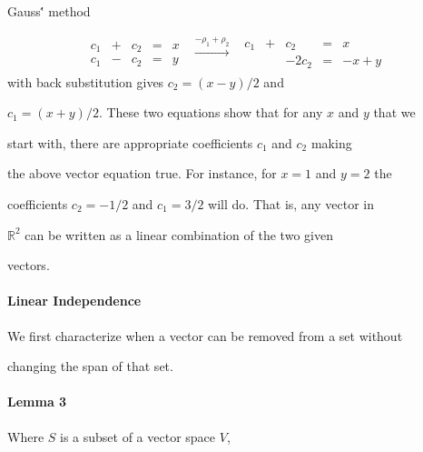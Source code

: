 Gauss\'' method



$$\begin{array}{rcl}

\begin{array}{*{2}{rc}r}

c_1  &+  &c_2  &=  &x  \\c_1  &-  &c_2  &=  &y

\end{array}

&\xrightarrow[]{-\rho_1+\rho_2}

&\begin{array}{*{2}{rc}r}

c_1  &+  &c_2    &=  &x  \\&   &-2c_2  &=  &-x+y

\end{array}

\end{array}$$ with back substitution gives $c_2=(x-y)/2$ and

$c_1=(x+y)/2$. These two equations show that for any $x$ and $y$ that we

start with, there are appropriate coefficients $c_1$ and $c_2$ making

the above vector equation true. For instance, for $x=1$ and $y=2$ the

coefficients $c_2=-1/2$ and $c_1=3/2$ will do. That is, any vector in

$\mathbb{R}^2$ can be written as a linear combination of the two given

vectors.



\paragraph{Linear Independence}



We first characterize when a vector can be removed from a set without

changing the span of that set.



\paragraph{Lemma 3}



Where $S$ is a subset of a vector space $V$,



